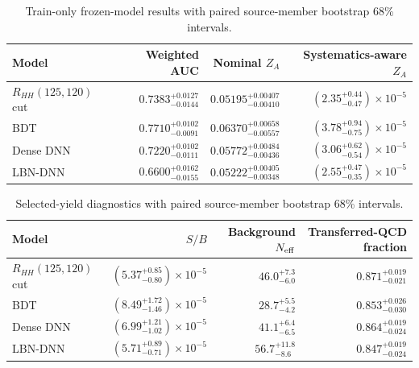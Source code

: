 \begin{table}[tb]
  \centering
  \footnotesize
  \caption{Train-only frozen-model results with paired source-member bootstrap 68\% intervals.}
  \label{tab:baseline-uncertainty-summary}
  \begin{tabular}{lrrr}
    \toprule
    Model & Weighted AUC & Nominal $Z_A$ & Systematics-aware $Z_A$ \\
    \midrule
    $R_{HH}(125,120)$ cut & $0.7383^{+0.0127}_{-0.0144}$ & $0.05195^{+0.00407}_{-0.00410}$ & $(2.35^{+0.44}_{-0.47})\times10^{-5}$ \\
    BDT & $0.7710^{+0.0102}_{-0.0091}$ & $0.06370^{+0.00658}_{-0.00557}$ & $(3.78^{+0.94}_{-0.75})\times10^{-5}$ \\
    Dense DNN & $0.7220^{+0.0102}_{-0.0111}$ & $0.05772^{+0.00484}_{-0.00436}$ & $(3.06^{+0.62}_{-0.54})\times10^{-5}$ \\
    LBN-DNN & $0.6600^{+0.0162}_{-0.0155}$ & $0.05222^{+0.00405}_{-0.00348}$ & $(2.55^{+0.47}_{-0.35})\times10^{-5}$ \\
    \bottomrule
  \end{tabular}
\end{table}
\begin{table}[tb]
  \centering
  \footnotesize
  \caption{Selected-yield diagnostics with paired source-member bootstrap 68\% intervals.}
  \label{tab:selected-yield-uncertainty-summary}
  \begin{tabular}{lrrr}
    \toprule
    Model & $S/B$ & Background $N_{\rm eff}$ & Transferred-QCD fraction \\
    \midrule
    $R_{HH}(125,120)$ cut & $(5.37^{+0.85}_{-0.80})\times10^{-5}$ & $46.0^{+7.3}_{-6.0}$ & $0.871^{+0.019}_{-0.021}$ \\
    BDT & $(8.49^{+1.72}_{-1.46})\times10^{-5}$ & $28.7^{+5.5}_{-4.2}$ & $0.853^{+0.026}_{-0.030}$ \\
    Dense DNN & $(6.99^{+1.21}_{-1.02})\times10^{-5}$ & $41.1^{+6.4}_{-6.5}$ & $0.864^{+0.019}_{-0.024}$ \\
    LBN-DNN & $(5.71^{+0.89}_{-0.71})\times10^{-5}$ & $56.7^{+11.8}_{-8.6}$ & $0.847^{+0.019}_{-0.024}$ \\
    \bottomrule
  \end{tabular}
\end{table}
